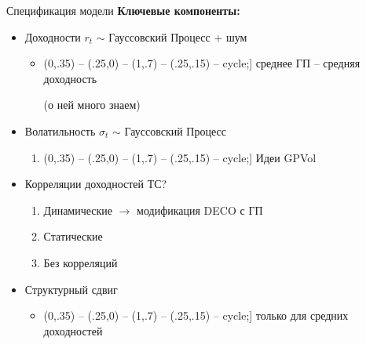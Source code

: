 \documentclass[12pt]{beamer}
\def\checkmarksmall{\tikz\fill[scale=0.5](0,.35) -- (.25,0) -- (1,.7) -- (.25,.15) -- cycle;}
\begin{document}
\begin{frame}{Спецификация модели}
\textbf{Ключевые компоненты:}
\begin{itemize}
	\item Доходности $r_t$ $\sim$ Гауссовский Процесс + шум
	\begin{itemize}
		\item[\checkmarksmall] среднее ГП -- средняя доходность
		
		(о ней много знаем)
	\end{itemize}
	\item<2-> Волатильность $\sigma_t$ $\sim$ Гауссовский Процесс
	\begin{enumerate}
		\item[\checkmarksmall] Идеи GPVol
	\end{enumerate}
	\item<3-> Корреляции доходностей ТС?
	\begin{enumerate}
		\item Динамические $\rightarrow$ модификация DECO с ГП
		\item Статические 
		\item Без корреляций
	\end{enumerate}
	\item<4-> Структурный сдвиг
	\begin{itemize}
		\item[\checkmarksmall] только для средних доходностей
	\end{itemize}
\end{itemize}
\begin{overlayarea}{\textwidth}{5cm}
\end{overlayarea}
\end{frame}
\end{document}

